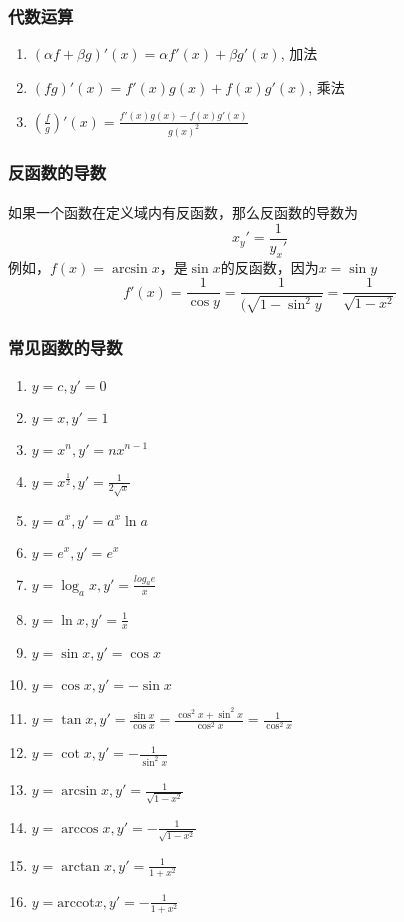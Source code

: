 \subsubsection{代数运算}
\begin{enumerate}
\item $(\alpha f + \beta g)'(x) = \alpha f'(x) + \beta g'(x)$, 加法
\item $(fg)'(x) = f'(x)g(x) + f(x)g'(x)$, 乘法
\item $(\frac{f}{g})'(x) = \frac{f'(x)g(x) - f(x)g'(x)}{g(x)^2}$
\end{enumerate}

\subsubsection{反函数的导数}
\paragraph{}
如果一个函数在定义域内有反函数，那么反函数的导数为
$$
x_y' = \frac{1}{y_x'}
$$
例如，$f(x) = \arcsin{x}$，是$\sin{x}$的反函数，因为$x = \sin{y}$
$$
f'(x) = \frac{1}{\cos{y}} = \frac{1}{(\sqrt{1 - \sin^2{y}} } = \frac{1}{\sqrt{1 - x^2}}
$$

\subsubsection{常见函数的导数}
\begin{enumerate}
\item $y = c, y' = 0$
\item $y = x, y' = 1$
\item $y = x^n, y' = nx^{n-1}$
\item $y = x^{\frac{1}{2}}, y' = \frac{1}{2\sqrt{x}}$
\item $y = a^x, y' = a^x \ln{a}$
\item $y = e^x, y' = e^x$
\item $y = \log_a{x}, y' = \frac{log_a{e}}{x}$
\item $y = \ln{x}, y' = \frac{1}{x}$
\item $y = \sin{x}, y' = \cos{x}$
\item $y = \cos{x}, y' = -\sin{x}$
\item $y = \tan{x}, y' = \frac{\sin{x}}{\cos{x}} = \frac{\cos^2{x} + \sin^2{x}}{\cos^2{x}} = \frac{1}{\cos^2{x}} $
\item $y = \cot{x}, y' = -\frac{1}{\sin^2{x}}$
\item $y = \arcsin{x}, y' = \frac{1}{\sqrt{1 - x^2}}$
\item $y = \arccos{x}, y' = -\frac{1}{\sqrt{1 - x^2}}$
\item $y = \arctan{x}, y' = \frac{1}{1 + x^2}$
\item $y = \mathrm{arccot} x, y' = -\frac{1}{1 + x^2}$
\end{enumerate}

